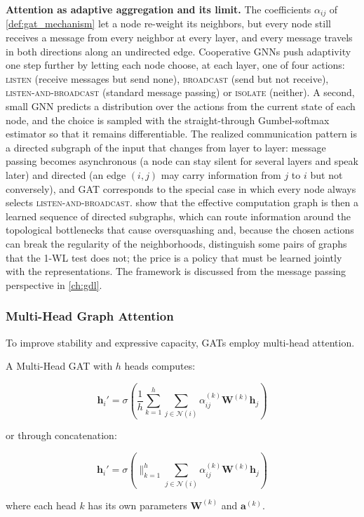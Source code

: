 \textbf{Attention as adaptive aggregation and its limit.} The coefficients $\alpha_{ij}$ of \autoref{def:gat_mechanism} let a node re-weight its neighbors, but every node still receives a message from every neighbor at every layer, and every message travels in both directions along an undirected edge. Cooperative \glspl{GNN} \citep{finkelshtein2024cognn} push adaptivity one step further by letting each node choose, at each layer, one of four actions: \textsc{listen} (receive messages but send none), \textsc{broadcast} (send but not receive), \textsc{listen-and-broadcast} (standard message passing) or \textsc{isolate} (neither). A second, small \gls{GNN} predicts a distribution over the actions from the current state of each node, and the choice is sampled with the straight-through Gumbel-softmax estimator so that it remains differentiable. The realized communication pattern is a directed subgraph of the input that changes from layer to layer: message passing becomes asynchronous (a node can stay silent for several layers and speak later) and directed (an edge $(i,j)$ may carry information from $j$ to $i$ but not conversely), and \gls{GAT} corresponds to the special case in which every node always selects \textsc{listen-and-broadcast}. \citet{finkelshtein2024cognn} show that the effective computation graph is then a learned sequence of directed subgraphs, which can route information around the topological bottlenecks that cause \gls{oversquashing} and, because the chosen actions can break the regularity of the neighborhoods, distinguish some pairs of graphs that the 1-WL test does not; the price is a policy that must be learned jointly with the representations. The framework is discussed from the message passing perspective in \autoref{ch:gdl}.

\subsubsection{Multi-Head Graph Attention}\label{subsubsec:multihead_graph_attention}

To improve stability and expressive capacity, \glspl{GAT} employ multi-head attention.

\begin{definition}\label{def:multihead_gat}
A Multi-Head GAT with $h$ heads computes:

\begin{equation}
    \mathbf{h}_i' = \sigma\left(\frac{1}{h}\sum_{k=1}^{h} \sum_{j \in \mathcal{N}(i)} \alpha_{ij}^{(k)} \mathbf{W}^{(k)}\mathbf{h}_j\right)
    \label{eq:multihead_gat_average}
\end{equation}

or through concatenation:

\begin{equation}
    \mathbf{h}_i' = \sigma\left(\|_{k=1}^{h} \sum_{j \in \mathcal{N}(i)} \alpha_{ij}^{(k)} \mathbf{W}^{(k)}\mathbf{h}_j\right)
    \label{eq:multihead_gat_concat}
\end{equation}

where each head $k$ has its own parameters $\mathbf{W}^{(k)}$ and $\mathbf{a}^{(k)}$.
\end{definition}


